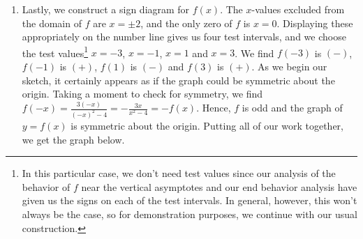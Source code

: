 \documentclass{ximera}
\begin{document}
\begin{example}
\begin{enumerate}
\begin{image}
\end{image}
\begin{center}
\end{center}

\item  Lastly, we construct a sign diagram for $f(x)$.  The $x$-values excluded from the domain of $f$ are $x = \pm 2$, and the only zero of $f$ is $x=0$.  Displaying these appropriately on the number line gives us four test intervals, and we choose the test values\footnote{In this particular case, we don't need test values since our analysis of the behavior of $f$ near the vertical asymptotes and our end behavior analysis have given us the signs on each of the test intervals.  In general, however, this won't always be the case, so for demonstration purposes, we continue with our usual construction.} $x=-3$, $x=-1$, $x=1$ and $x=3$.  We find $f(-3)$ is $(-)$, $f(-1)$ is $(+)$, $f(1)$ is $(-)$ and $f(3)$ is $(+)$.  As we begin our sketch, it certainly appears as if the graph could be symmetric about the origin.  Taking a moment to check for symmetry, we find $f(-x) = \frac{3(-x)}{(-x)^2-4} = -\frac{3x}{x^2-4} = -f(x)$.  Hence, $f$ is odd and the graph of $y = f(x)$ is symmetric about the origin. Putting all of our work together, we get the graph below.


\end{enumerate}
\end{example}
\end{document}
